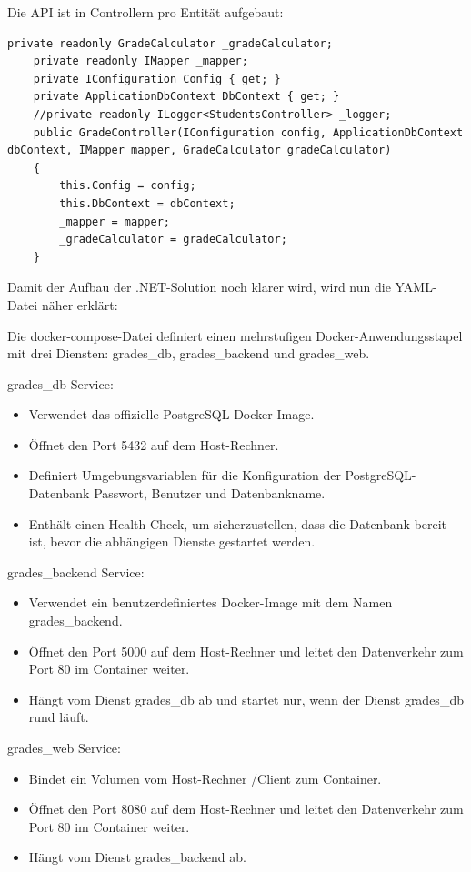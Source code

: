 \newpage

Die API ist in Controllern pro Entität aufgebaut:
\begin{lstlisting}[language={[Sharp]C}, caption=API - Controller, label=lst:imp:controller]
    private readonly GradeCalculator _gradeCalculator;
    private readonly IMapper _mapper;
    private IConfiguration Config { get; }
    private ApplicationDbContext DbContext { get; }
    //private readonly ILogger<StudentsController> _logger;
    public GradeController(IConfiguration config, ApplicationDbContext dbContext, IMapper mapper, GradeCalculator gradeCalculator) 
    {
        this.Config = config;
        this.DbContext = dbContext;
        _mapper = mapper;
        _gradeCalculator = gradeCalculator;       
    }
\end{lstlisting}

\newpage
Damit der Aufbau der .NET-Solution noch klarer wird, wird nun die YAML-Datei näher erklärt:

Die docker-compose-Datei definiert einen mehrstufigen Docker-Anwendungsstapel mit drei Diensten: 
grades_db, grades_backend und grades_web.

grades_db Service: 
    \begin{itemize}
        \item Verwendet das offizielle PostgreSQL Docker-Image.
        \item Öffnet den Port 5432 auf dem Host-Rechner.
        \item Definiert Umgebungsvariablen für die Konfiguration der PostgreSQL-Datenbank Passwort, Benutzer und Datenbankname.
        \item Enthält einen Health-Check, um sicherzustellen, dass die Datenbank bereit ist, bevor die abhängigen Dienste gestartet werden.
    \end{itemize}
grades_backend Service:
    \begin{itemize}
        \item Verwendet ein benutzerdefiniertes Docker-Image mit dem Namen grades_backend.
        \item Öffnet den Port 5000 auf dem Host-Rechner und leitet den Datenverkehr zum Port 80 im Container weiter.
        \item Hängt vom Dienst grades_db ab und startet nur, wenn der Dienst grades_db rund läuft.
    \end{itemize}
grades_web Service:
    \begin{itemize}
        \item Bindet ein Volumen vom Host-Rechner /Client zum Container.
        \item Öffnet den Port 8080 auf dem Host-Rechner und leitet den Datenverkehr zum Port 80 im Container weiter.
        \item Hängt vom Dienst grades_backend ab.
    \end{itemize}

